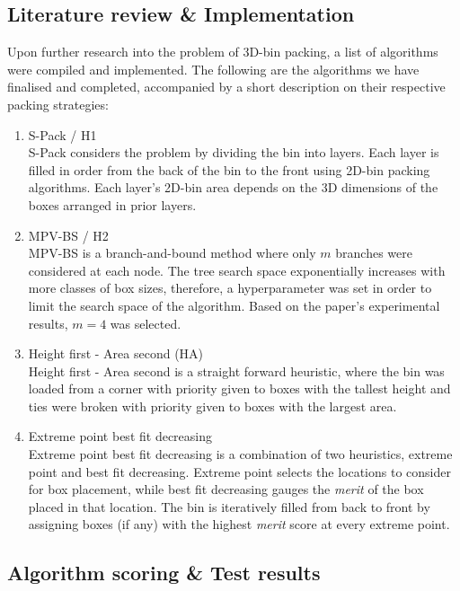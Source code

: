 \documentclass[a4paper, 11pt]{article}
\begin{document}
\subsection*{Literature review \& Implementation}

Upon further research into the problem of 3D-bin packing, a list of algorithms were compiled and implemented. The following are the algorithms we have finalised and completed, accompanied by a short description on their respective packing strategies:\begin{enumerate}
\item S-Pack / H1 \cite{Martello}\\

S-Pack considers the problem by dividing the bin into layers. Each layer is filled in order from the back of the bin to the front using 2D-bin packing algorithms. Each layer's 2D-bin area depends on the 3D dimensions of the boxes arranged in prior layers.
\item MPV-BS / H2 \cite{Martello}\\

MPV-BS is a branch-and-bound method where only $m$ branches were considered at each node. The tree search space exponentially increases with more classes of box sizes, therefore, a hyperparameter was set in order to limit the search space of the algorithm. Based on the paper's experimental results, $m=4$ was selected.
\item Height first - Area second (HA) \cite{HA}\\

Height first - Area second is a straight forward heuristic, where the bin was loaded from a corner with priority given to boxes with the tallest height and ties were broken with priority given to boxes with the largest area.
\item Extreme point best fit decreasing \cite{Extreme}\\

Extreme point best fit decreasing is a combination of two heuristics, extreme point and best fit decreasing. Extreme point selects the locations to consider for box placement, while best fit decreasing gauges the \textit{merit} of the box placed in that location. The bin is iteratively filled from back to front by assigning boxes (if any) with the highest \textit{merit} score at every extreme point.
\end{enumerate}

\subsection*{Algorithm scoring \& Test results}
\end{document}
